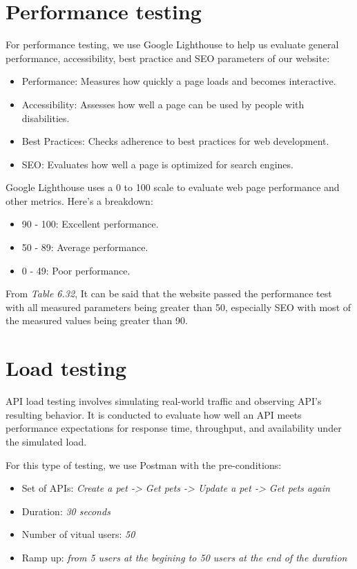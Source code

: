 \section{Performance testing}
For performance testing, we use Google Lighthouse to help us evaluate general performance, accessibility, best practice and SEO parameters of our website:
\begin{itemize}
  \item Performance: Measures how quickly a page loads and becomes interactive.
  \item Accessibility: Assesses how well a page can be used by people with disabilities.
  \item Best Practices: Checks adherence to best practices for web development.
  \item SEO: Evaluates how well a page is optimized for search engines.
\end{itemize}
Google Lighthouse uses a 0 to 100 scale to evaluate web page performance and other metrics. Here’s a breakdown:
\begin{itemize}
  \item 90 - 100: Excellent performance.
  \item 50 - 89: Average performance.
  \item 0 - 49: Poor performance.
\end{itemize}



From \textit{Table 6.32}, It can be said that the website passed the performance test with all measured parameters being greater than 50, especially SEO with most of the measured values being greater than 90.

\section{Load testing}
API load testing involves simulating real-world traffic and observing API’s resulting behavior. It is conducted to evaluate how well an API meets performance expectations for response time, throughput, and availability under the simulated load.

For this type of testing, we use Postman with the pre-conditions:
\begin{itemize}
  \item Set of APIs: \textit{ Create a pet -> Get pets -> Update a pet -> Get pets again}
  \item Duration: \textit{30 seconds}
  \item Number of vitual users: \textit{50}
  \item Ramp up: \textit{from 5 users at the begining to 50 users at the end of the duration}
\end{itemize}

